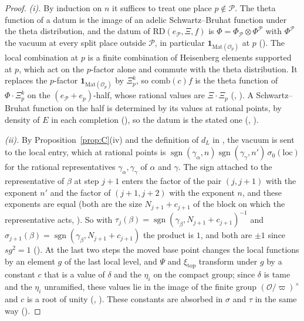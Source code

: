 \documentclass[11pt]{article}
\newcommand{\Ok}{\mathcal O}
\newcommand{\Mat}{\mathrm{Mat}}
\newcommand{\sgn}{\operatorname{sgn}}
\theoremstyle{definition}
\theoremstyle{remark}
\begin{document}
\begin{proof}
\emph{(i).} By induction on $n$ it suffices to treat one place $p\notin\mathcal P$. The theta function of a datum is the image of an adelic Schwartz--Bruhat function under the theta distribution, and the datum of $\mathrm{RD}(e_{\mathcal P},\Xi,f)$ is $\Phi=\Phi_{\mathcal P}\otimes\Phi^{\mathcal P}$ with $\Phi^{\mathcal P}$ the vacuum at every split place outside $\mathcal P$, in particular $\mathbf 1_{\Mat(\Ok_p)}$ at $p$ (). The local combination at $p$ is a finite combination of Heisenberg elements supported at $p$, which act on the $p$-factor alone and commute with the theta distribution. It replaces the $p$-factor $\mathbf 1_{\Mat(\Ok_p)}$ by $\Xi^{k}_p$, so $\mathrm{comb}(c)f$ is the theta function of $\Phi\cdot\Xi^{k}_p$ on the $(e_{\mathcal P}+e_p)$-half, whose rational values are $\Xi\cdot\Xi_p$ (, ). A Schwartz--Bruhat function on the half is determined by its values at rational points, by density of $E$ in each completion (), so the datum is the stated one (, ).

\emph{(ii).} By Proposition~\ref{prop:C}(iv) and the definition of $d_L$ in , the vacuum is sent to the local entry, which at rational points is $\sgn(\gamma_\alpha,n)\sgn(\gamma_\gamma,n')\,\sigma_0(\mathrm{loc})$ for the rational representatives $\gamma_\alpha,\gamma_\gamma$ of $\alpha$ and $\gamma$. The sign attached to the representative of $\beta$ at step $j+1$ enters the factor of the pair $(j,j+1)$ with the exponent $n'$ and the factor of $(j+1,j+2)$ with the exponent $n$, and these exponents are equal (both are the size $N_{j+1}+c_{j+1}$ of the block on which the representative acts, ). So with $\tau_j(\beta)=\sgn(\gamma_\beta,N_{j+1}+c_{j+1})^{-1}$ and $\sigma_{j+1}(\beta)=\sgn(\gamma_\beta,N_{j+1}+c_{j+1})$ the product is $1$, and both are $\pm1$ since $sg^2=1$ (). At the last two steps the moved base point changes the local functions by an element $g$ of the last local level, and $\Psi$ and $\xi_{\mathrm{top}}$ transform under $g$ by a constant $c$ that is a value of $\delta$ and the $\eta_i$ on the compact group; since $\delta$ is tame and the $\eta_i$ unramified, these values lie in the image of the finite group $(\Ok/\varpi)^\times$ and $c$ is a root of unity (, ). These constants are absorbed in $\sigma$ and $\tau$ in the same way ().


\end{proof}
\end{document}
